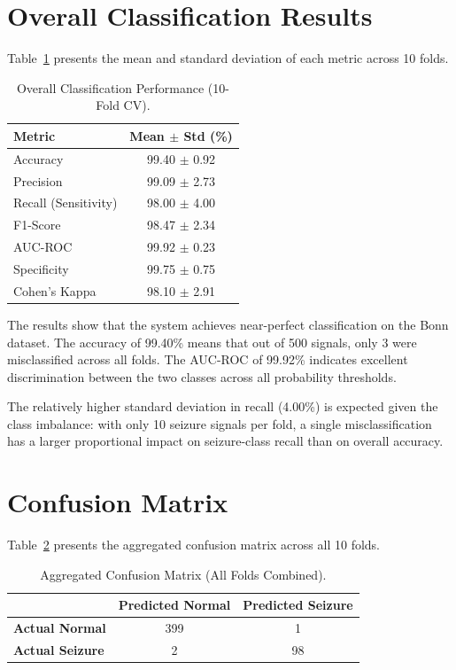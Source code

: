 \section{Overall Classification Results}

Table~\ref{tab:overall} presents the mean and standard deviation of each metric across 10 folds.

\begin{table}[htbp]
\centering
\renewcommand{\arraystretch}{1.4}
\caption{Overall Classification Performance (10-Fold CV).}
\label{tab:overall}
\begin{tabular}{|l|c|}
\hline
\textbf{Metric} & \textbf{Mean $\pm$ Std (\%)} \\
\hline
Accuracy & 99.40 $\pm$ 0.92 \\
\hline
Precision & 99.09 $\pm$ 2.73 \\
\hline
Recall (Sensitivity) & 98.00 $\pm$ 4.00 \\
\hline
F1-Score & 98.47 $\pm$ 2.34 \\
\hline
AUC-ROC & 99.92 $\pm$ 0.23 \\
\hline
Specificity & 99.75 $\pm$ 0.75 \\
\hline
Cohen's Kappa & 98.10 $\pm$ 2.91 \\
\hline
\end{tabular}
\end{table}

The results show that the system achieves near-perfect classification on the Bonn dataset. The accuracy of 99.40\% means that out of 500 signals, only 3 were misclassified across all folds. The AUC-ROC of 99.92\% indicates excellent discrimination between the two classes across all probability thresholds.

The relatively higher standard deviation in recall (4.00\%) is expected given the class imbalance: with only 10 seizure signals per fold, a single misclassification has a larger proportional impact on seizure-class recall than on overall accuracy.

\section{Confusion Matrix}

Table~\ref{tab:confusion} presents the aggregated confusion matrix across all 10 folds.

\begin{table}[htbp]
\centering
\renewcommand{\arraystretch}{1.4}
\caption{Aggregated Confusion Matrix (All Folds Combined).}
\label{tab:confusion}
\begin{tabular}{|l|c|c|}
\hline
 & \textbf{Predicted Normal} & \textbf{Predicted Seizure} \\
\hline
\textbf{Actual Normal} & 399 & 1 \\
\hline
\textbf{Actual Seizure} & 2 & 98 \\
\hline
\end{tabular}
\end{table}

